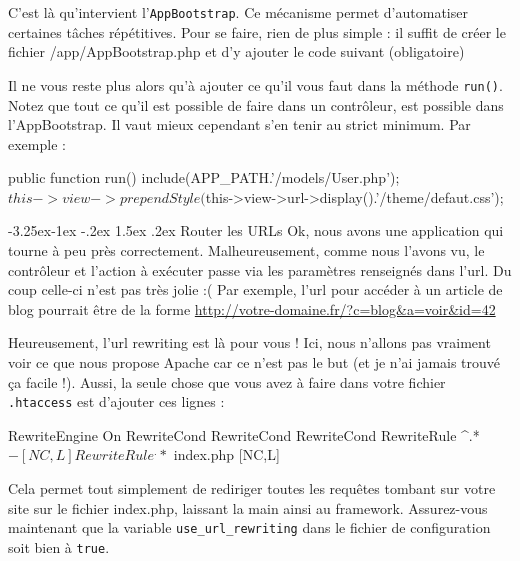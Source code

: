 \documentclass[a4paper,11pt]{article}
\makeatletter
\renewcommand{\subsection}{\@startsection{subsection}{2}{\z@}%
             {-3.25ex\@plus -1ex \@minus -.2ex}%
             {1.5ex \@plus .2ex}%
             {\color{bleuFonce}\normalfont\large\bfseries}}
\makeatother
\begin{document}
C'est là qu'intervient l'\texttt{AppBootstrap}. Ce mécanisme permet d'automatiser certaines tâches répétitives. Pour se faire, rien de plus simple : il suffit de créer le fichier /app/AppBootstrap.php et d'y ajouter le code suivant (obligatoire)

Il ne vous reste plus alors qu'à ajouter ce qu'il vous faut dans la méthode \texttt{run()}. Notez que tout ce qu'il est possible de faire dans un contrôleur, est possible dans l'AppBootstrap. Il vaut mieux cependant s'en tenir au strict minimum. Par exemple :
\begin{PHP}
public function run() {
  include(APP_PATH.'/models/User.php');
  $this->view->prependStyle($this->view->url->display().'/theme/defaut.css');
}
\end{PHP}


\subsection{Router les URLs}
Ok, nous avons une application qui tourne à peu près correctement. Malheureusement, comme nous l'avons vu, le contrôleur et l'action à exécuter passe via les paramètres renseignés dans l'url. Du coup celle-ci n'est pas très jolie :( Par exemple, l'url pour accéder à un article de blog pourrait être de la forme \url{http://votre-domaine.fr/?c=blog&a=voir&id=42}

Heureusement, l'url rewriting est là pour vous ! Ici, nous n'allons pas vraiment voir ce que nous propose Apache car ce n'est pas le but (et je n'ai jamais trouvé ça facile !). Aussi, la seule chose que vous avez à faire dans votre fichier \texttt{.htaccess} est d'ajouter ces lignes :
\begin{htaccess}
RewriteEngine On
RewriteCond %
RewriteCond %
RewriteCond %
RewriteRule ^.*$ - [NC,L]
RewriteRule ^.*$ index.php [NC,L]
\end{htaccess}

Cela permet tout simplement de rediriger toutes les requêtes tombant sur votre site sur le fichier index.php, laissant la main ainsi au framework. Assurez-vous maintenant que la variable \texttt{use\_url\_rewriting} dans le fichier de configuration soit bien à \texttt{true}.
\end{document}
